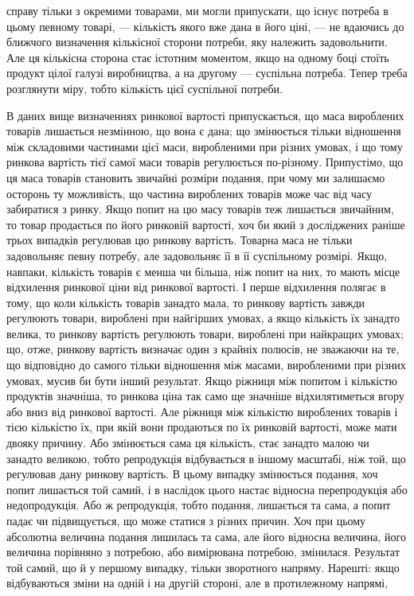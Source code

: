 \parcont{}  %
справу тільки з окремими товарами, ми могли припускати, що
існує потреба в цьому певному товарі, — кількість якого вже
дана в його ціні, — не вдаючись до ближчого визначення кількісної сторони потреби, яку належить
задовольнити. Але ця
кількісна сторона стає істотним моментом, якщо на одному боці
стоїть продукт цілої галузі виробництва, а на другому — суспільна потреба. Тепер треба розглянути
міру, тобто кількість цієї суспільної потреби.

В даних вище визначеннях ринкової вартості припускається,
що маса вироблених товарів лишається незмінною, що вона
є дана; що змінюється тільки відношення між складовими частинами цієї маси, виробленими при різних
умовах, і що тому
ринкова вартість тієї самої маси товарів регулюється по-різному.
Припустімо, що ця маса товарів становить звичайні розміри
подання, при чому ми залишаємо осторонь ту можливість, що
частина вироблених товарів може час від часу забиратися
з ринку. Якщо попит на цю масу товарів теж лишається звичайним, то товар продається по його ринковій
вартості, хоч би
який з досліджених раніше трьох випадків регулював цю ринкову вартість. Товарна маса не тільки
задовольняє певну потребу, але задовольняє її в її суспільному розмірі. Якщо, навпаки, кількість
товарів є менша чи більша, ніж попит на них,
то мають місце відхилення ринкової ціни від ринкової вартості.
І перше відхилення полягає в тому, що коли кількість товарів
занадто мала, то ринкову вартість завжди регулюють товари,
вироблені при найгірших умовах, а якщо кількість їх занадто
велика, то ринкову вартість регулюють товари, вироблені при
найкращих умовах; що, отже, ринкову вартість визначає один
з крайніх полюсів, не зважаючи на те, що відповідно до самого
тільки відношення між масами, виробленими при різних умовах,
мусив би бути інший результат. Якщо ріжниця між попитом
і кількістю продуктів значніша, то ринкова ціна так само ще
значніше відхилятиметься вгору або вниз від ринкової вартості.
Але ріжниця між кількістю вироблених товарів і тією кількістю
їх, при якій вони продаються по їх ринковій вартості, може
мати двояку причину. Або змінюється сама ця кількість, стає
занадто малою чи занадто великою, тобто репродукція відбувається в іншому масштабі, ніж той, що
регулював дану
ринкову вартість. В цьому випадку змінюється подання, хоч
попит лишається той самий, і в наслідок цього настає відносна
перепродукція або недопродукція. Або ж репродукція, тобто
подання, лишається та сама, а попит падає чи підвищується,
що може статися з різних причин. Хоч при цьому абсолютна
величина подання лишилась та сама, але його відносна величина,
його величина порівняно з потребою, або вимірювана потребою,
змінилася. Результат той самий, що й у першому випадку,
тільки зворотного напряму. Нарешті: якщо відбуваються зміни
на одній і на другій стороні, але в протилежному напрямі,
\parbreak{}  %
